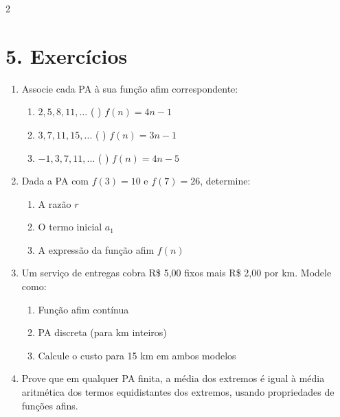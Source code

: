 \documentclass[11pt]{article}
\begin{document}
\begin{multicols}{2}
\section*{5. Exercícios}
\begin{enumerate}
\item Associe cada PA à sua função afim correspondente:
\begin{enumerate}[label=\alph*)]
\item $2, 5, 8, 11, \ldots$ \quad ( ) $f(n) = 4n - 1$
\item $3, 7, 11, 15, \ldots$ \quad ( ) $f(n) = 3n - 1$
\item $-1, 3, 7, 11, \ldots$ \quad ( ) $f(n) = 4n - 5$
\end{enumerate}

\item Dada a PA com $f(3) = 10$ e $f(7) = 26$, determine:
\begin{enumerate}[label=\alph*)]
\item A razão $r$
\item O termo inicial $a_1$
\item A expressão da função afim $f(n)$
\end{enumerate}

\item Um serviço de entregas cobra R\$ 5,00 fixos mais R\$ 2,00 por km. Modele como:
\begin{enumerate}[label=\alph*)]
\item Função afim contínua
\item PA discreta (para km inteiros)
\item Calcule o custo para 15 km em ambos modelos
\end{enumerate}

\item Prove que em qualquer PA finita, a média dos extremos é igual à média aritmética dos termos equidistantes dos extremos, usando propriedades de funções afins.
\end{enumerate}

\end{multicols}
\end{document}
